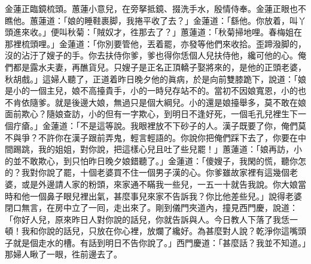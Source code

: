 金蓮正臨鏡梳頭。蕙蓮小意兒，在旁拏抵鏡、掇洗手水，殷情侍奉。金蓮正眼也不瞧他。蕙蓮道：「娘的睡鞋裹脚，我捲平收了去？」金蓮道：「繇他。你放着，叫丫頭進來收。」便叫秋菊：「賊奴才，徃那去了？」蕙蓮道：「秋菊掃地哩。春梅姐在那裡梳頭哩。」金蓮道：「你別要管他，丟着罷，亦發等他們來收拾。歪蹄潑脚的，沒的沾汙了嫂子的手。你去扶侍你爹，爹也得你恁個人兒扶侍他，纔可他的心。俺們都是露水夫妻，再醮貨兒。只嫂子是正名正頂轎子娶將來的，是他的正頭老婆，秋胡戲。」這婦人聽了，正道着昨日晚夕他的眞病，於是向前雙膝跪下，說道：「娘是小的一個主兒，娘不高擡貴手，小的一時兒存站不的。當初不因娘寬恩，小的也不肯依隨爹。就是後邊大娘，無過只是個大綱兒。小的還是娘擡舉多，莫不敢在娘面前欺心？隨娘查訪，小的但有一字欺心，到明日不逢好死，一個毛孔兒裡生下一個疔瘡。」{}金蓮道：「不是這等說。我眼裡放不下砂子的人。漢子既要了你，俺們莫不與爭？不許你在漢子跟前弄鬼，輕言輕語的。你說你把俺們踩下去了，你要在中間踢跳，我的姐姐，對你說，把這樣心兒且吐了些兒罷！」蕙蓮道：「娘再訪，小的並不敢欺心，到只怕昨日晚夕娘錯聽了。」金蓮道：「傻嫂子，我閑的慌，聽你怎的？我對你說了罷，十個老婆買不住一個男子漢的心。你爹雖故家裡有這幾個老婆，或是外邊請人家的粉頭，來家通不瞞我一些兒，一五一十就告我說。{}你大娘當時和他一個鼻子眼兒裡出氣，甚麼事兒來家不告訴我？你比他差些兒。」說得老婆閉口無言，在房中立了一囘，走出來了。剛到儀門夾道內，撞見西門慶，說道：「你好人兒，原來昨日人對你說的話兒，你就告訴與人。{}今日教人下落了我恁一頓！我和你說的話兒，只放在你心裡，放爛了纔好。為甚麼對人說？乾淨你這嘴頭子就是個走水的槽。有話到明日不告你說了。」西門慶道：「甚麼話？我並不知道。」{}那婦人瞅了一眼，徃前邊去了。

